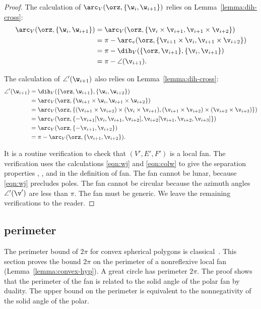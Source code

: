 \begin{proof}
The calculation of $\arc_V(\orz,\{\w_i,\w_{i+1}\})$ relies on
 Lemma~\ref{lemma:dih-cross}:
\begin{align*}
\arc_V(\orz,\{\w_i,\w_{i+1}\}) 
&= \arc_V(\orz,\{\v_i\times\v_{i+1},\v_{i+1}\times \v_{i+2}\}) \\
&=\pi - \arc_v(\orz,\{\v_{i+1}\times\v_i,\v_{i+1}\times\v_{i+2}\})\\
&=\pi - \dih_V(\{\orz,\v_{i+1}\},\{\v_i,\v_{i+1}\})\\
&=\pi - \angle(\v_{i+1}).
\end{align*}

The calculation of $\angle'(\w_{i+1})$ also relies on Lemma~\ref{lemma:dih-cross}:
\begin{align*}
\angle'(\w_{i+1}) 
&= \dih_V(\{\orz,\w_{i+1}\},\{\w_i,\w_{i+2}\}) \\
&= \arc_V (\orz,\{\w_{i+1}\times \w_{i},\w_{i+1}\times \w_{i+2}\})\\
&=\arc_V(\orz,\{ (\v_{i+1}\times \v_{i+2}) \times (\v_i\times \v_{i+1}),
   (\v_{i+1}\times \v_{i+2}) \times (\v_{i+2}\times \v_{i+3}) \})\\
&= \arc_V(\orz,\{ - \v_{i+1} [\v_i,\v_{i+1},\v_{i+2}], 
   \v_{i+2} [\v_{i+1},\v_{i+2},\v_{i+3}]\})\\
&=\arc_V(\orz,\{-\v_{i+1},\v_{i+2}\})\\
&=\pi -\arc_V(\orz,\{\v_{i+1},\v_{i+2}\}).
\end{align*}

It is a routine verification to check that $(V',E',F')$ is a local
fan.  The verification uses the calculations \eqref{eqn:wj} and
\eqref{eqn:colw} to give the separation properties ,
, and  in the definition of fan.
The fan cannot be lunar, because \eqref{eqn:wj} precludes poles.
The fan cannot be circular because the azimuth angles $\angle'(\v')$
are less than $\pi$.  The fan must be generic.
We leave the remaining verifications  to the reader.
\end{proof}
%


\subsection{perimeter}

The perimeter bound of $2\pi$ for convex spherical polygons is
classical~\cite[p.~100]{vanderWaerden:1951}.   This
section proves the bound $2\pi$ on the perimeter of a nonreflexive
local fan (Lemma~\ref{lemma:convex-hyp}).  A great circle has
perimeter $2\pi$.  The proof shows that the perimeter of the
fan is related to the solid angle of the polar fan by duality.
The upper bound on the perimeter is equivalent to the nonnegativity
of the solid angle of the polar.

